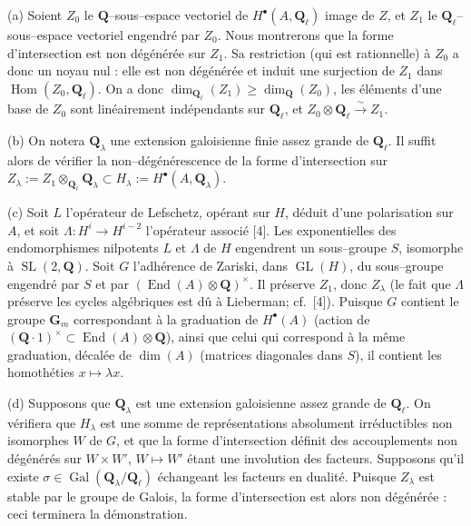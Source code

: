 \documentclass[11pt,a4paper]{article}
\theoremstyle{plain}
\theoremstyle{definition}
\DeclareMathOperator{\Hom}{Hom}
\DeclareMathOperator{\Gal}{Gal}
\DeclareMathOperator{\End}{End}
\DeclareMathOperator{\SL}{SL}
\DeclareMathOperator{\GL}{GL}
\begin{document}
(a) Soient $Z_0$ le $\mathbf{Q}$--sous--espace vectoriel de $H^\bullet(A, \mathbf{Q}_\ell)$ image de $Z$, et $Z_1$ le $\mathbf{Q}_\ell$--sous--espace vectoriel engendr\'e par $Z_0$. Nous montrerons que la forme d'intersection est non d\'eg\'en\'er\'ee sur $Z_1$. Sa restriction (qui est rationnelle) \`a $Z_0$ a donc un noyau nul : elle est non d\'eg\'en\'er\'ee et induit une surjection de $Z_1$ dans $\Hom(Z_0, \mathbf{Q}_\ell)$. On a donc $\dim_{\mathbf{Q}_\ell}(Z_1) \geq \dim_{\mathbf{Q}}(Z_0)$, les \'el\'ements d'une base de $Z_0$ sont lin\'eairement ind\'ependants sur $\mathbf{Q}_\ell$, et $Z_0 \otimes \mathbf{Q}_\ell \xrightarrow{\sim} Z_1$.

(b) On notera $\mathbf{Q}_\lambda$ une extension galoisienne finie assez grande de $\mathbf{Q}_\ell$. Il suffit alors de v\'erifier la non--d\'eg\'en\'erescence de la forme d'intersection sur $Z_\lambda := Z_1 \otimes_{\mathbf{Q}_\ell} \mathbf{Q}_\lambda \subset H_\lambda := H^\bullet(A, \mathbf{Q}_\lambda)$.

(c) Soit $L$ l'op\'erateur de Lefschetz, op\'erant sur $H$, d\'eduit d'une polarisation sur $A$, et soit $\Lambda : H^i \to H^{i-2}$ l'op\'erateur associ\'e [4]. Les exponentielles des endomorphismes nilpotents $L$ et $\Lambda$ de $H$ engendrent un sous--groupe $S$, isomorphe \`a $\SL(2, \mathbf{Q})$. Soit $G$ l'adh\'erence de Zariski, dans $\GL(H)$, du sous--groupe engendr\'e par $S$ et par $(\End(A) \otimes \mathbf{Q})^\times$. Il pr\'eserve $Z_1$, donc $Z_\lambda$ (le fait que $\Lambda$ pr\'eserve les cycles alg\'ebriques est d\^u \`a Lieberman; cf.\ [4]). Puisque $G$ contient le groupe $\mathbf{G}_m$ correspondant \`a la graduation de $H^\bullet(A)$ (action de $(\mathbf{Q} \cdot 1)^\times \subset \End(A) \otimes \mathbf{Q}$), ainsi que celui qui correspond \`a la m\^eme graduation, d\'ecal\'ee de $\dim(A)$ (matrices diagonales dans $S$), il contient les homoth\'eties $x \mapsto \lambda x$.

(d) Supposons que $\mathbf{Q}_\lambda$ est une extension galoisienne assez grande de $\mathbf{Q}_\ell$. On v\'erifiera que $H_\lambda$ est une somme de repr\'esentations absolument irr\'eductibles non isomorphes $W$ de $G$, et que la forme d'intersection d\'efinit des accouplements non d\'eg\'en\'er\'es sur $W \times W'$, $W \mapsto W'$ \'etant une involution des facteurs. Supposons qu'il existe $\sigma \in \Gal(\mathbf{Q}_\lambda/\mathbf{Q}_\ell)$ \'echangeant les facteurs en dualit\'e. Puisque $Z_\lambda$ est stable par le groupe de Galois, la forme d'intersection est alors non d\'eg\'en\'er\'ee : ceci terminera la d\'emonstration.
\end{document}
